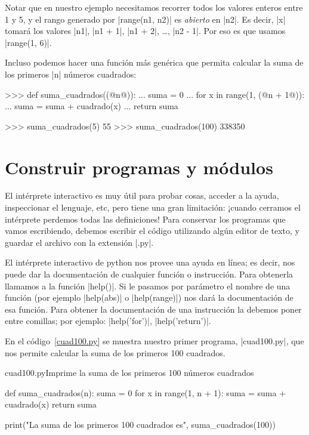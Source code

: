 Notar que en nuestro ejemplo necesitamos recorrer todos los valores enteros
entre 1 y 5, y el rango generado por |range(n1, n2)| es \emph{abierto} en |n2|.
Es decir, |x| tomará los valores |n1|, |n1 + 1|, |n1 + 2|, \ldots, |n2 - 1|.
Por eso es que usamos |range(1, 6)|.

Incluso podemos hacer una función más genérica que permita calcular la suma de
los primeros |n| números cuadrados:

\begin{codigo-python-sn}
>>> def suma_cuadrados((@n@)):
...     suma = 0
...     for x in range(1, (@n + 1@)):
...         suma = suma + cuadrado(x)
...     return suma

>>> suma_cuadrados(5)
55
>>> suma_cuadrados(100)
338350
\end{codigo-python-sn}

\section{Construir programas y módulos}

El intérprete interactivo es muy útil para probar cosas, acceder a la ayuda,
inspeccionar el lenguaje, etc, pero tiene una gran limitación: ¡cuando cerramos
el intérprete perdemos todas las definiciones! Para conservar los programas que
vamos escribiendo, debemos escribir el código utilizando algún editor de texto,
y guardar el archivo con la extensión |.py|.

\begin{sabias_que}
El intérprete interactivo de python nos provee una ayuda en línea; es decir,
nos puede dar la documentación de cualquier función o instrucción. Para
obtenerla llamamos a la función |help()|. Si le pasamos por parámetro el nombre
de una función (por ejemplo |help(abs)| o |help(range)|) nos dará la
documentación de esa función. Para obtener la documentación de una instrucción
la debemos poner entre comillas; por ejemplo: |help('for')|, |help('return')|.
\end{sabias_que}

En el código~\ref{cuad100.py} se muestra nuestro primer programa, |cuad100.py|,
que nos permite calcular la suma de los primeros 100 cuadrados.

\begin{codigo}{cuad100.py}{Imprime la suma de los primeros 100 números
    cuadrados}
\label{cuad100.py}
\begin{codigo-python}
def suma_cuadrados(n):
    suma = 0
    for x in range(1, n + 1):
        suma = suma + cuadrado(x)
    return suma

print("La suma de los primeros 100 cuadrados es", suma_cuadrados(100))
\end{codigo-python}
\end{codigo}

